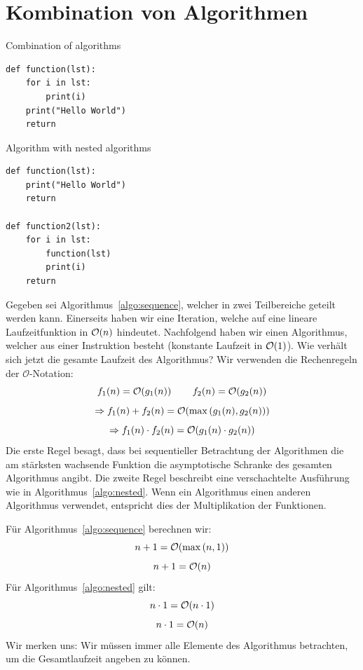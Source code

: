 \section{Kombination von Algorithmen}
%
\begin{algorithm}
\caption{Combination of algorithms}
\label{algo:sequence}
\begin{lstlisting}
def function(lst):
    for i in lst:
        print(i)
    print("Hello World")
    return
\end{lstlisting}
\end{algorithm}
\begin{algorithm}
\caption{Algorithm with nested algorithms}
\label{algo:nested}
\begin{lstlisting}
def function(lst):
    print("Hello World")
    return

def function2(lst):
    for i in lst:
        function(lst)
        print(i)
    return
\end{lstlisting}
\end{algorithm}
%
Gegeben sei Algorithmus~\ref{algo:sequence}, welcher in zwei Teilbereiche geteilt werden kann. Einerseits haben wir eine Iteration, welche auf eine lineare Laufzeitfunktion in $\mathcal{O}\!\left(n\right)$ hindeutet. Nachfolgend haben wir einen Algorithmus, welcher aus einer Instruktion besteht (konstante Laufzeit in $\mathcal{O}\!\left(1\right)$). Wie verhält sich jetzt die gesamte Laufzeit des Algorithmus? Wir verwenden die Rechenregeln der $\mathcal{O}$-Notation:
%
\[
  f_1(n) = \mathcal{O}\!\left(g_1(n)\right)  \qquad  f_2(n) = \mathcal{O}\!\left(g_2(n)\right)
\] \[
  \Rightarrow f_1(n) + f_2(n) = \mathcal{O}\!\left(\max{\left(g_1(n), g_2(n)\right)}\right)
\] \[
  \Rightarrow f_1(n) \cdot f_2(n) = \mathcal{O}\!\left(g_1(n) \cdot g_2(n)\right)
\]
%
Die erste Regel besagt, dass bei sequentieller Betrachtung der Algorithmen die am stärksten wachsende Funktion die asymptotische Schranke des gesamten Algorithmus angibt. Die zweite Regel beschreibt eine verschachtelte Ausführung wie in Algorithmus~\ref{algo:nested}. Wenn ein Algorithmus einen anderen Algorithmus verwendet, entspricht dies der Multiplikation der Funktionen.

Für Algorithmus~\ref{algo:sequence} berechnen wir:
%
\[
  n + 1 = \mathcal{O}\!\left(\max\left(n, 1\right)\right)
\] \[
  n + 1 = \mathcal{O}\!\left(n\right)
\]
Für Algorithmus~\ref{algo:nested} gilt:
\[
  n \cdot 1 = \mathcal{O}\!\left(n \cdot 1\right)
\] \[
  n \cdot 1 = \mathcal{O}\!\left(n\right)
\]
%
Wir merken uns: Wir müssen immer alle Elemente des Algorithmus betrachten, um die Gesamtlaufzeit angeben zu können.
%
